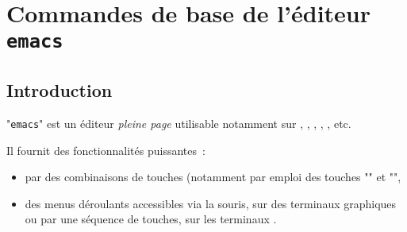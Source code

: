 %
%

\section{Commandes de base de l'{\'e}diteur {\tt emacs}}
\renewcommand{\arraystretch}{1.5}

\subsection{Introduction}

"{\tt emacs}" est un {\'e}diteur {\sl pleine page} utilisable notamment sur
{\Unix}, {\OpenVMS}, {\DOS}, {\Windows}, {\MacOS}, etc.

Il fournit des fonctionnalit{\'e}s puissantes~:
\begin{itemize}
	\item	par des combinaisons de touches (notamment par emploi des touches
			"\ctrlkey" et "\esckey",
	\item	des menus d{\'e}roulants accessibles via la souris, sur des terminaux
			graphiques ou par une s{\'e}quence de touches, sur les terminaux
			{\ASCII}.
\end{itemize}


